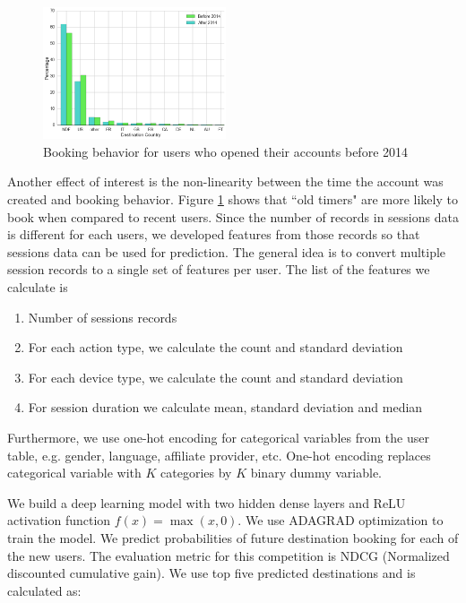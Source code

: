 \documentclass[12pt]{article}
\begin{document}
\begin{figure}
\begin{center}
	\includegraphics[width=0.48\textwidth]{account_active}
\end{center}
\caption{Booking behavior for users who opened their accounts before 2014}
\label{fig:account_active}
\end{figure}
Another effect of interest is the non-linearity between the  time the account was created and booking behavior. Figure \ref{fig:account_active} shows that ``old timers" are more likely to book when compared to recent users. Since the number of records in sessions data is different for each users, we developed features from those records so that sessions data can be used for prediction. The general idea is to convert multiple session records to a single set of features per user. The list of the features we calculate is 
\begin{enumerate}[label=(\roman*)] 
	\item Number of sessions records
	\item For each action type, we calculate the count and standard deviation
	\item For each device type, we calculate the count and standard deviation
	\item For session duration we calculate mean, standard deviation and median
\end{enumerate}
Furthermore, we use one-hot encoding for categorical variables from the user table, e.g. gender, language, affiliate provider, etc. One-hot encoding replaces categorical variable with $K$ categories by $K$ binary dummy variable. 


We build a deep learning model with two hidden dense layers and ReLU activation function $f(x) = \max(x,0)$. We use ADAGRAD optimization  to train the model. We predict probabilities of future destination booking for each of the new users. The evaluation metric for this competition is NDCG (Normalized discounted cumulative gain). We use top five predicted destinations and is calculated as:
\end{document}
